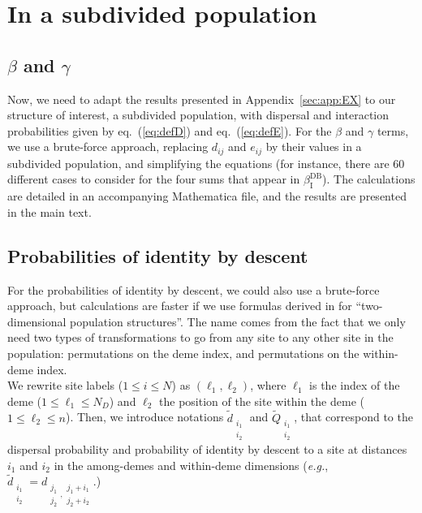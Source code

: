 \documentclass[11pt, letterpaper]{article}
\renewcommand{\eqref}[1]{\textup{{\normalfont eq.~(\ref{#1}}\normalfont)}}
\newcommand{\eg}{\textit{e.g.}}
\newcommand{\appname}[0]{Appendix}
\newcommand{\indirect}{\mathrm{I}}
\newcommand{\DB}{\textrm{DB}}
\newcommand{\ndemes}{N_D}
\begin{document}
\clearpage
\section{In a subdivided population}

\subsection{$\beta$ and $\gamma$}
Now, we need to adapt the results presented in \appname~\ref{sec:app:EX} to our structure of interest, a subdivided population, with dispersal and interaction probabilities given by \eqref{eq:defD} and \eqref{eq:defE}. For the $\beta$ and $\gamma$ terms, we use a brute-force approach, replacing $d_{ij}$ and $e_{ij}$ by their values in a subdivided population, and simplifying the equations (for instance, there are $60$ different cases to consider for the four sums that appear in $\beta_{\indirect}^{\DB}$). The calculations are detailed in an accompanying Mathematica file, and the results are presented in the main text. 

\subsection{Probabilities of identity by descent}
For the probabilities of identity by descent, we could also use a brute-force approach, but calculations are faster if we use formulas derived in \citet{Debarre2017} for ``two-dimensional population structures''. The name comes from the fact that we only need two types of transformations to go from any site to any other site in the population: permutations on the deme index, and permutations on the within-deme index.  \\
%
We rewrite site labels ($1\leq i \leq N$) as $(\ell_1, \ell_2)$, where $\ell_1$ is the index of the deme ($1\leq \ell_1 \leq \ndemes$) and $\ell_2$ the position of the site within the deme ($1\leq \ell_2 \leq n$). Then, we introduce notations $\tilde{d}_{\substack{i_1\\i_2}}$ and $\tilde{Q}_{\substack{i_1\\i_2}}$, that correspond to the dispersal probability and probability of identity by descent to a site at distances $i_1$ and $i_2$ in the among-demes and within-deme dimensions (\eg, $\tilde{d}_{\substack{i_1\\i_2}} = d_{\substack{j_1\\j_2}, \substack{j_1+i_1\\j_2+i_2}}$.) 
\end{document}
